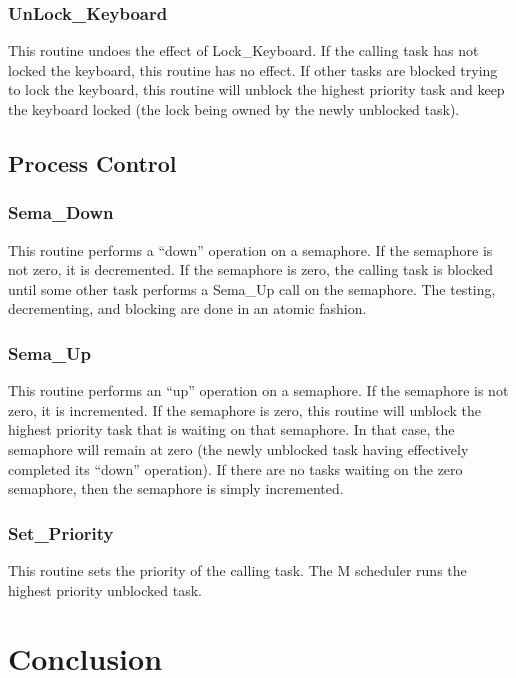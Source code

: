 \documentclass{article}
\begin{document}
\subsubsection{UnLock\_Keyboard}

This routine undoes the effect of Lock\_Keyboard. If the calling task has not locked the
keyboard, this routine has no effect. If other tasks are blocked trying to lock the keyboard,
this routine will unblock the highest priority task and keep the keyboard locked (the lock being
owned by the newly unblocked task).

\subsection{Process Control}

\subsubsection{Sema\_Down}

This routine performs a ``down'' operation on a semaphore. If the semaphore is not zero, it is
decremented. If the semaphore is zero, the calling task is blocked until some other task
performs a Sema\_Up call on the semaphore. The testing, decrementing, and blocking are done in
an atomic fashion.

\subsubsection{Sema\_Up}

This routine performs an ``up'' operation on a semaphore. If the semaphore is not zero, it is
incremented. If the semaphore is zero, this routine will unblock the highest priority task that
is waiting on that semaphore. In that case, the semaphore will remain at zero (the newly
unblocked task having effectively completed its ``down'' operation). If there are no tasks
waiting on the zero semaphore, then the semaphore is simply incremented.

\subsubsection{Set\_Priority}

This routine sets the priority of the calling task. The M scheduler runs the highest priority
unblocked task.

\section{Conclusion}
\end{document}
